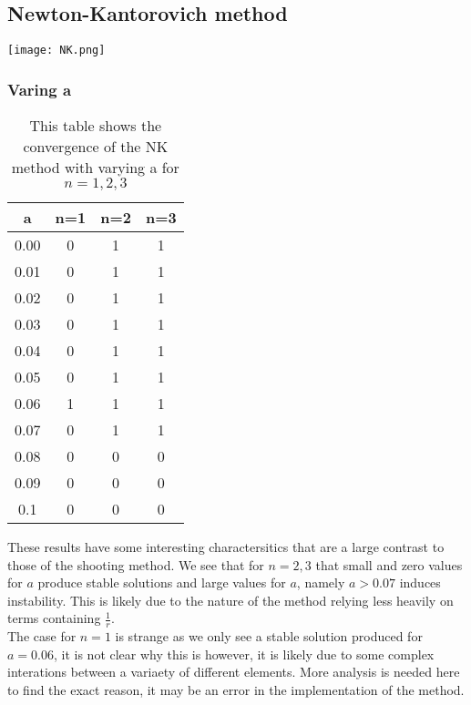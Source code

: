 \documentclass{article}
\begin{document}
\subsection{Newton-Kantorovich method}
\texttt{[image: NK.png]}
\subsubsection{Varing a}
\begin{table}[H]
\centering
\begin{tabular}{|c|c|c|c|}
\hline
a & n=1  & n=2 & n=3 \\
\hline
0.00 & 0 & 1 & 1\\
0.01 & 0 & 1 & 1\\
0.02 & 0 & 1 & 1\\
0.03 & 0 & 1 & 1\\
0.04 & 0 & 1 & 1\\
0.05 & 0 & 1 & 1\\
0.06 & 1 & 1 & 1\\
0.07 & 0 & 1 & 1\\
0.08 & 0 & 0 & 0\\
0.09 & 0 & 0 & 0\\
0.1 & 0 & 0 & 0\\
\hline
\end{tabular}
\caption{This table shows the convergence of the NK method with varying a for $n=1,2,3$}
\end{table}
These results have some interesting charactersitics that are a large contrast to those of the shooting method. We see that for $n=2,3$ that small and zero values for $a$ produce stable solutions and large values for $a$, namely $a>0.07$ induces instability. This is likely due to the nature of the method relying less heavily on terms containing $\frac{1}{r}$. \\
The case for $n=1$ is strange as we only see a stable solution produced for $a=0.06$, it is not clear why this is however, it is likely due to some complex interations between a variaety of different elements. More analysis is needed here to find the exact reason, it may be an error in the implementation of the method. 
\end{document}
